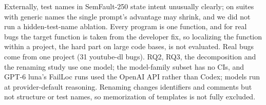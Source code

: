 Externally, test names in SemFault-250 state intent unusually clearly; on suites with generic names the
single prompt's advantage may shrink, and we did not run a hidden-test-name ablation. Every program is one function, and
for real bugs the target function is taken from the developer fix, so localizing the function within a project, the
hard part on large code bases, is not evaluated. Real bugs come from one project (31 youtube-dl bugs). RQ2, RQ3, the
decomposition and the renaming study use one model; the model-family subset has no CIs, and GPT-6 luna's FailLoc runs used the OpenAI API rather than Codex; models run at provider-default
reasoning. Renaming changes identifiers and comments but not structure or test names, so memorization of templates is
not fully excluded.
